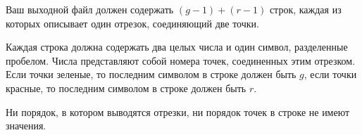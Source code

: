 Ваш выходной файл должен содержать $(g - 1) + (r - 1)$ строк, каждая из которых описывает один отрезок, соединяющий две точки.

Каждая строка должна содержать два целых числа и один символ, разделенные пробелом. Числа представляют собой номера точек, соединенных этим отрезком. Если точки зеленые, то последним символом в строке должен быть $g$, если точки красные, то последним символом в строке должен быть $r$.

Ни порядок, в котором выводятся отрезки, ни порядок точек в строке не имеют значения. 